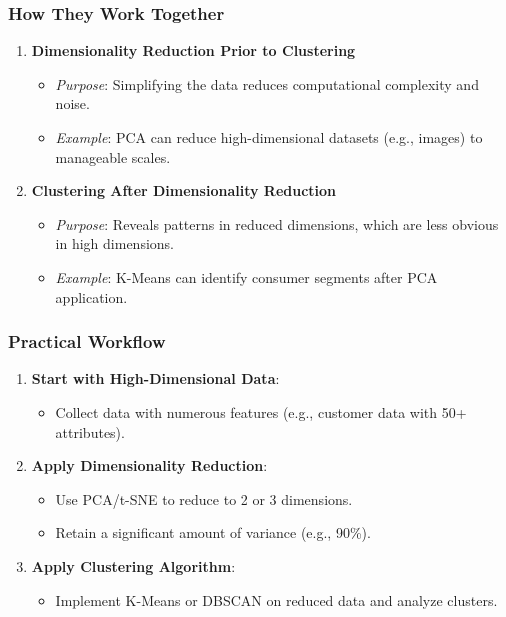 \documentclass[aspectratio=169]{beamer}
\begin{document}
\begin{frame}[fragile]
    \frametitle{How They Work Together}
    \begin{enumerate}
        \item \textbf{Dimensionality Reduction Prior to Clustering}
            \begin{itemize}
                \item \textit{Purpose}: Simplifying the data reduces computational complexity and noise.
                \item \textit{Example}: PCA can reduce high-dimensional datasets (e.g., images) to manageable scales.
            \end{itemize}
        \item \textbf{Clustering After Dimensionality Reduction}
            \begin{itemize}
                \item \textit{Purpose}: Reveals patterns in reduced dimensions, which are less obvious in high dimensions.
                \item \textit{Example}: K-Means can identify consumer segments after PCA application.
            \end{itemize}
    \end{enumerate}
\end{frame}

\begin{frame}[fragile]
    \frametitle{Practical Workflow}
    \begin{enumerate}
        \item \textbf{Start with High-Dimensional Data}:
            \begin{itemize}
                \item Collect data with numerous features (e.g., customer data with 50+ attributes).
            \end{itemize}
        \item \textbf{Apply Dimensionality Reduction}:
            \begin{itemize}
                \item Use PCA/t-SNE to reduce to 2 or 3 dimensions.
                \item Retain a significant amount of variance (e.g., 90\%).
            \end{itemize}
        \item \textbf{Apply Clustering Algorithm}:
            \begin{itemize}
                \item Implement K-Means or DBSCAN on reduced data and analyze clusters.
            \end{itemize}
    \end{enumerate}
\end{frame}
\end{document}
